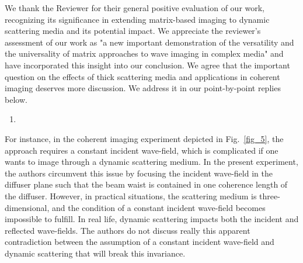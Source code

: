 \documentclass[12pt]{article}
\newenvironment{solved_reviewercomment}
    {\begin{tcolorbox}[width=\linewidth,colback=gray!5,colframe=solved_commentcolor!50,title=Reviewer Comment,left=5pt,right=5pt]}
    {\end{tcolorbox}}
\newenvironment{ourresponse}
    {\begin{tcolorbox}[width=\linewidth,breakable,enhanced,colback=gray!5,colframe=responsecolor!50,title=Response,left=5pt,right=5pt]}
    {\end{tcolorbox}}
\begin{document}
\begin{ourresponse}
    We thank the Reviewer for their general positive evaluation of our work, recognizing its significance in extending matrix-based imaging to dynamic scattering media and its potential impact. We appreciate the reviewer's assessment of our work as "a new important demonstration of the versatility and the universality of matrix approaches to wave imaging in complex media" and have incorporated this insight into our conclusion. We agree that the important question on the effects of thick scattering media and applications in coherent imaging deserves more discussion. We address it in our point-by-point replies below.
\end{ourresponse}


\begin{enumerate}[label=\arabic*.]
\item \leavevmode
\end{enumerate}
\vspace{-1em}
\begin{solved_reviewercomment}
    For instance, in the coherent imaging experiment depicted in Fig.~\ref{fig_5}, the approach requires a constant incident wave-field, which is complicated if one wants to image through a dynamic scattering medium. In the present experiment, the authors circumvent this issue by focusing the incident wave-field in the diffuser plane such that the beam waist is contained in one coherence length of the diffuser. However, in practical situations, the scattering medium is three-dimensional, and the condition of a constant incident wave-field becomes impossible to fulfill. In real life, dynamic scattering impacts both the incident and reflected wave-fields. The authors do not discuss really this apparent contradiction between the assumption of a constant incident wave-field and dynamic scattering that will break this invariance.
\end{solved_reviewercomment}
\end{document}
